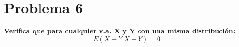 \section*{Problema 6}
\textbf{Verifica que para cualquier v.a. X y Y con una misma distribución:}
\begin{equation*}
    E(X-Y|X+Y) = 0
\end{equation*}